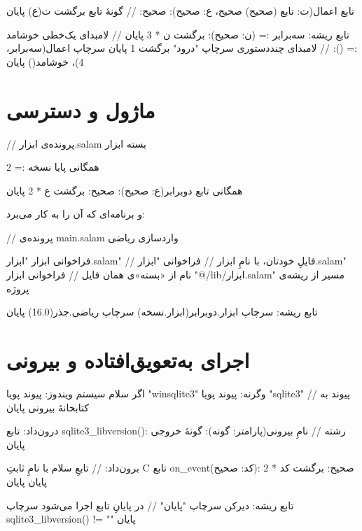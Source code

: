 \begin{salamfa}
تابع اعمال(ت: تابع (صحیح) صحیح، ع: صحیح): صحیح:   // گونهٔ تابع
    برگشت ت(ع)
پایان

تابع ریشه:
    سه‌برابر := (ن: صحیح): برگشت ن * 3 پایان   // لامبدای یک‌خطی
    خوشامد := ():                                // لامبدای چنددستوری
        سرچاپ "درود"
        برگشت 1
    پایان
    سرچاپ اعمال(سه‌برابر، 4)، خوشامد()
پایان
\end{salamfa}

\section{ماژول و دسترسی}

\begin{salamfa}
// پرونده‌ی ابزار.salam
بسته ابزار

همگانی پایا نسخه := 2

همگانی تابع دوبرابر(ع: صحیح): صحیح:
    برگشت ع * 2
پایان
\end{salamfa}

و برنامه‌ای که آن را به کار می‌برد:

\begin{salamfa}
// پرونده‌ی main.salam
واردسازی ریاضی

فراخوانی ابزار "ابزار.salam"         // فایلِ خودتان، با نامِ ابزار
// فراخوانی "ابزار.salam"            نام از «بسته»ی همان فایل
// فراخوانی ابزار "@/lib/ابزار.salam"   مسیر از ریشه‌ی پروژه

تابع ریشه:
    سرچاپ ابزار.دوبرابر(ابزار.نسخه)
    سرچاپ ریاضی.جذر(16.0)
پایان
\end{salamfa}

\section{اجرای به‌تعویق‌افتاده و بیرونی}

\begin{salamfa}
اگر سلام سیستم ویندوز:
    پیوند پویا "winsqlite3"
وگرنه:
    پیوند پویا "sqlite3"              // پیوند به کتابخانهٔ بیرونی
پایان

درون‌داد:
    تابع sqlite3_libversion(): رشته    // نامِ بیرونی(پارامتر: گونه): گونهٔ خروجی
پایان

برون‌داد:                              // تابعِ سلام با نامِ ثابتِ C
    تابع on_event(کد: صحیح): صحیح:
        برگشت کد * 2
    پایان
پایان

تابع ریشه:
    دیرکن سرچاپ "پایان"                // در پایانِ تابع اجرا می‌شود
    سرچاپ sqlite3_libversion() != ""
پایان
\end{salamfa}


